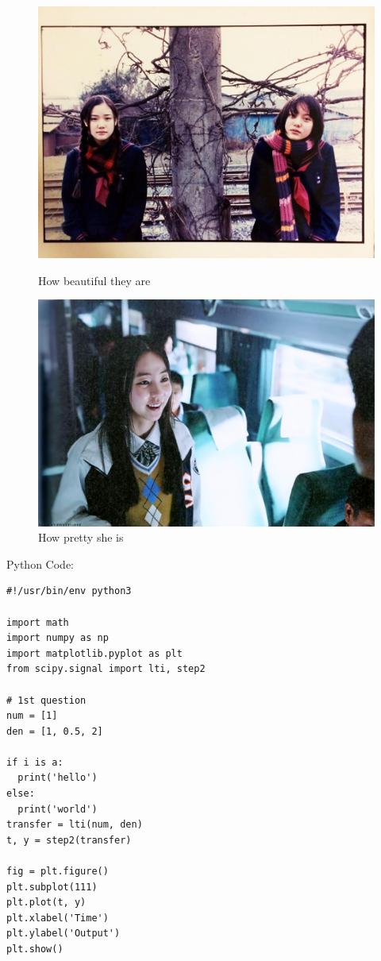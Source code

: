 \documentclass{mytemplate}
\begin{document}
\begin{figure}[!htb] %
  \includegraphics[width=\linewidth]{graph.jpg}
  \caption{How beautiful they are}\label{twoprettygirls}
\endminipage\hfill
{}
  \includegraphics[width=\linewidth]{graph1.jpg}
  \caption{How pretty she is}\label{koreangirl}
\endminipage\hfill
\end{figure}

\newpage
Python Code:
\begin{lstlisting}
#!/usr/bin/env python3

import math
import numpy as np
import matplotlib.pyplot as plt
from scipy.signal import lti, step2

# 1st question
num = [1]
den = [1, 0.5, 2]

if i is a:
  print('hello')
else:
  print('world')
transfer = lti(num, den)
t, y = step2(transfer)

fig = plt.figure()
plt.subplot(111)
plt.plot(t, y)
plt.xlabel('Time')
plt.ylabel('Output')
plt.show()
\end{lstlisting}
\end{document}
